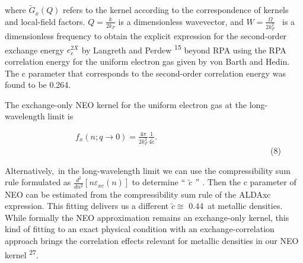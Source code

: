 \documentclass[12pt]{article}
\renewcommand{\_}{\kern-1.5pt\textunderscore\kern-1.5pt}
\begin{document}
\vspace{\baselineskip}
\setlength{\parskip}{9.96pt}
\setlength{\parskip}{0.0pt}
\begin{justify}
where  \( \widetilde{G}_{x} \left( Q \right)  \)  refers to the kernel according to the correspondence of kernels and local-field factors.  \( Q=\frac{k}{2k_{F}} \)  is a dimensionless wavevector, and  \( W=\frac{ \Omega }{2k_{F}^{2}} \) \ is a dimensionless frequency to obtain the explicit expression for the second-order exchange energy   \( e_{c}^{2X} \)  by Langreth and Perdew \textsuperscript{15} beyond RPA using the RPA correlation energy for the uniform electron gas given by von Barth and Hedin. The c parameter that corresponds to the second-order correlation energy was found to be 0.264. 
\end{justify}\par

\begin{justify}
The exchange-only NEO kernel for the uniform electron gas at the long-wavelength limit is
\end{justify}\par


\vspace{\baselineskip}
\setlength{\parskip}{9.96pt}
\setlength{\parskip}{0.0pt}
\begin{Center}
\ \ \ \ \ \ \ \ \ \ \ \ \ \ \ \ \   \( f_{x} \left( n;q \rightarrow 0 \right) =\frac{4 \pi }{2k_{F}^{2}}\frac{1}{4\widetilde{c}}. \) \ \ \ \ \ \ \ \ \ \ \ \ \ \ \ \ \ \ \ \ \ \ \ \ \ \ \ \ \ \ \ \ \ \ \ \ \ \ \ \ \ \ \ \ \ \ \ \ \ \ \ \ \ \ \ \ \ \ \ \ \ \ \ \  (8)
\end{Center}\par


\vspace{\baselineskip}
\setlength{\parskip}{9.96pt}
\setlength{\parskip}{0.0pt}
\begin{justify}
Alternatively,\ in the long-wavelength limit we can use the compressibility sum rule formulated as   \( \frac{d^{2}}{dn^{2}} \left[ n \varepsilon _{xc} \left( n \right)  \right]  \)  to determine $``$ \( \widetilde{c} \) $"$ . Then the c parameter of NEO can be estimated from the compressibility sum rule of the ALDAxc expression. This fitting delivers us a different  \( \widetilde{c} \cong  \) 0.44\ at metallic densities.  While formally the NEO approximation remains an exchange-only kernel, this kind of fitting to an exact physical condition with an exchange-correlation approach brings the correlation effects relevant for metallic densities in our NEO kernel \textsuperscript{27}.
\end{justify}\par
\end{document}
